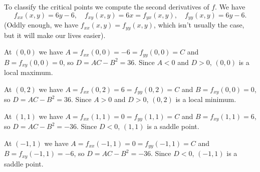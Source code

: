\documentclass[letterpaper,12pt]{article}
\begin{document}
\begin{enumerate}
\medskip

To classify the critical points we compute the second derivatives of $f$. We have
\[
 f_{xx}(x,y) = 6y-6, \quad f_{xy}(x,y) = 6x = f_{yx}(x,y), \quad f_{yy}(x,y) = 6y-6.
\]
(Oddly enough, we have $f_{xx}(x,y)=f_{yy}(x,y)$, which isn't usually the case, but it will make our lives easier).

At $(0,0)$ we have $A=f_{xx}(0,0) = -6 = f_{yy}(0,0)=C$ and $B=f_{xy}(0,0)=0$, so $D=AC-B^2 = 36$. Since $A<0$ and $D>0$, $(0,0)$ is a local maximum.

At $(0,2)$ we have $A=f_{xx}(0,2) = 6 = f_{yy}(0,2)=C$ and $B = f_{xy}(0,0)=0$, so $D=AC-B^2=36$. Since $A>0$ and $D>0$, $(0,2)$ is a local minimum.

At $(1,1)$ we have $A=f_{xx}(1,1) = 0 = f_{yy}(1,1)=C$ and $B = f_{xy}(1,1) = 6$, so $D=AC-B^2=-36$. Since $D<0$, $(1,1)$ is a saddle point.

At $(-1,1)$ we have $A=f_{xx}(-1,1) = 0 = f_{yy}(-1,1)=C$ and $B = f_{xy}(-1,1) = -6$, so $D=AC-B^2=-36$. Since $D<0$, $(-1,1)$ is a saddle point.

\end{enumerate}
\end{document}
